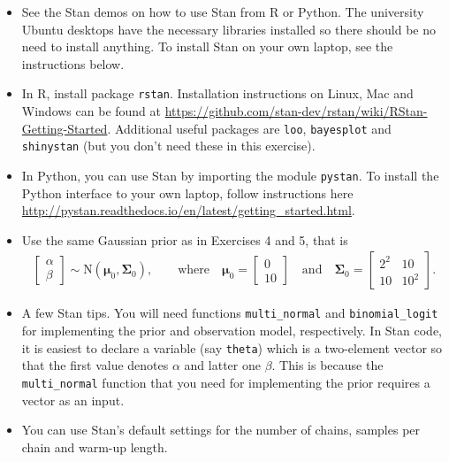 \documentclass[a4paper,11pt]{article}
\newcommand{\vc}[1] { \mathbf{#1} }
\newcommand{\vs}[1] { \boldsymbol{#1} }
\begin{document}
\begin{itemize}
\item See the Stan demos on how to use Stan from R or Python. The university Ubuntu desktops have the necessary libraries installed so there should be no need to install anything. To install Stan on your own laptop, see the instructions below.

\item In R, install package {\tt rstan}. Installation instructions on Linux, Mac and Windows can be found at \url{https://github.com/stan-dev/rstan/wiki/RStan-Getting-Started}. Additional useful packages are {\tt loo}, {\tt bayesplot} and {\tt shinystan} (but you don't need these in this exercise).

\item In Python, you can use Stan by importing the module {\tt pystan}. To install the Python interface to your own laptop, follow instructions here \url{http://pystan.readthedocs.io/en/latest/getting_started.html}.

\item Use the same Gaussian prior as in Exercises 4 and 5, that is 
\begin{align*}
	\begin{bmatrix}
	\alpha \\ \beta
	\end{bmatrix}
	\sim
	\text{N} \left(\vs \mu_0, \vc \Sigma_0 \right), \qquad
	\text{where} \quad
	\vs \mu_0 = \begin{bmatrix} 0 \\ 10 \end{bmatrix} \quad \text{and} \quad
	\vc \Sigma_0 = \begin{bmatrix} 2^2 & 10 \\ 10 & 10^2 \end{bmatrix}.
\end{align*}

\item A few Stan tips. You will need functions {\tt multi\_normal} and {\tt binomial\_logit} for implementing the prior and observation model, respectively. In Stan code, it is easiest to declare a variable (say {\tt theta}) which is a two-element vector so that the first value denotes $\alpha$ and latter one $\beta$. This is because the {\tt multi\_normal} function that you need for implementing the prior requires a vector as an input.

\item You can use Stan's default settings for the  number of chains, samples per chain and warm-up length. 


\end{itemize}
\end{document}
